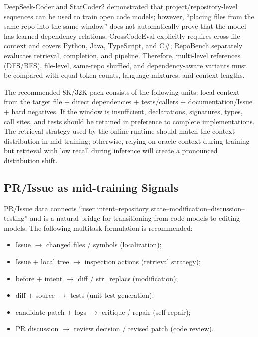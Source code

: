 \documentclass[10pt,a4paper,UTF8,fontset=none]{ctexart}
\newcommand{\ident}[1]{{\rmfamily #1}}
\begin{document}
DeepSeek-Coder and StarCoder2 demonstrated that project/repository-level sequences can be used to train open code models\cite{en:guo2024deepseekcoder,en:lozhkov2024starcoder2}; however, ``placing files from the same repo into the same window'' does not automatically prove that the model has learned dependency relations. CrossCodeEval explicitly requires cross-file context and covers Python, Java, TypeScript, and C\#\cite{en:ding2023crosscodeeval}; RepoBench separately evaluates retrieval, completion, and pipeline\cite{en:liu2023repobench}. Therefore, multi-level references (DFS/BFS), file-level, same-repo shuffled, and dependency-aware variants must be compared with equal token counts, language mixtures, and context lengths.

The recommended 8K/32K pack consists of the following units: local context from the target file + direct dependencies + tests/callers + documentation/Issue + hard negatives. If the window is insufficient, declarations, signatures, types, call sites, and tests should be retained in preference to complete implementations. The retrieval strategy used by the online runtime should match the context distribution in mid-training; otherwise, relying on oracle context during training but retrieval with low recall during inference will create a pronounced distribution shift.

\subsection{PR/Issue as mid-training Signals}

PR/Issue data connects ``user intent--repository state--modification--discussion--testing'' and is a natural bridge for transitioning from code models to editing models. The following multitask formulation is recommended:

\begin{itemize}
  \item Issue $\rightarrow$ changed files / symbols (localization);
  \item Issue + local tree $\rightarrow$ inspection actions (retrieval strategy);
  \item before + intent $\rightarrow$ diff / \ident{str\_replace} (modification);
  \item diff + source $\rightarrow$ tests (unit test generation);
  \item candidate patch + logs $\rightarrow$ critique / repair (self-repair);
  \item PR discussion $\rightarrow$ review decision / revised patch (code review).
\end{itemize}
\end{document}

